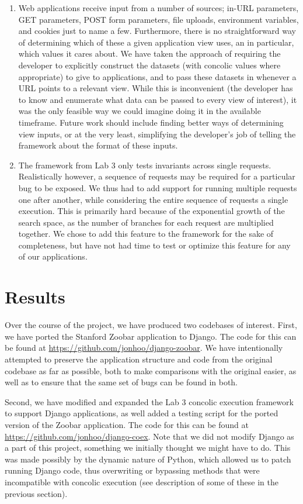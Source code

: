 \documentclass{scrartcl}
\begin{document}
\begin{enumerate}
	\item Web applications receive input from a number of sources; in-URL
		parameters, GET parameters, POST form parameters, file uploads,
		environment variables, and cookies just to name a few.
		Furthermore, there is no straightforward way of determining
		which of these a given application view uses, an in particular,
		which values it cares about. We have taken the approach of
		requiring the developer to explicitly construct the datasets
		(with concolic values where appropriate) to give to
		applications, and to pass these datasets in whenever a URL
		points to a relevant view. While this is inconvenient (the
		developer has to know and enumerate what data can be passed to
		every view of interest), it was the only feasible way we could
		imagine doing it in the available timeframe. Future work should
		include finding better ways of determining view inputs, or at
		the very least, simplifying the developer's job of telling the
		framework about the format of these inputs.
	
	\item The framework from Lab 3 only tests invariants across single
		requests. Realistically however, a sequence of requests may be
		required for a particular bug to be exposed. We thus had to add
		support for running multiple requests one after another, while
		considering the entire sequence of requests a single execution.
		This is primarily hard because of the exponential growth of the
		search space, as the number of branches for each request are
		multiplied together. We chose to add this feature to the
		framework for the sake of completeness, but have not had time
		to test or optimize this feature for any of our applications.
\end{enumerate}

\section{Results}
Over the course of the project, we have produced two codebases of interest.
First, we have ported the Stanford Zoobar application to Django. The code for
this can be found at \url{https://github.com/jonhoo/django-zoobar}. We have
intentionally attempted to preserve the application structure and code from the
original codebase as far as possible, both to make comparisons with the
original easier, as well as to ensure that the same set of bugs can be found in
both.

Second, we have modified and expanded the Lab 3 concolic execution framework to
support Django applications, as well added a testing script for the ported
version of the Zoobar application. The code for this can be found at
\url{https://github.com/jonhoo/django-coex}. Note that we did not modify Django
as a part of this project, something we initially thought we might have to do.
This was made possibly by the dynamic nature of Python, which allowed us to
patch running Django code, thus overwriting or bypassing methods that were
incompatible with concolic execution (see description of some of these in the
previous section).
\end{document}
